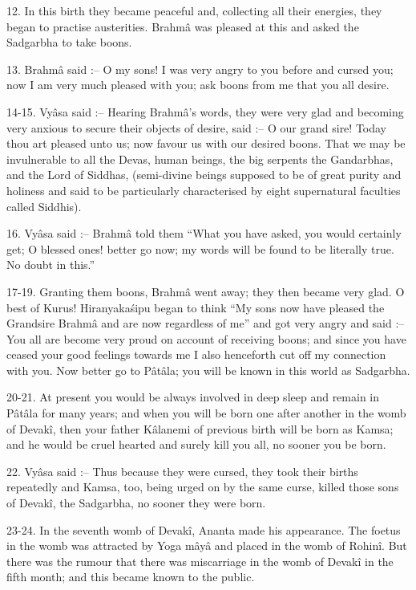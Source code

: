 12. In this birth they became peaceful and, collecting all their energies, they began to practise austerities. Brahm\^a was pleased at this and asked the Sadgarbha to take boons.

13. Brahm\^a said :-- O my sons! I was very angry to you before and cursed you; now I am very much pleased with you; ask boons from me that you all desire.

14-15. Vy\^asa said :-- Hearing Brahm\^a's words, they were very glad and becoming very anxious to secure their objects of desire, said :-- O our grand sire! Today thou art pleased unto us; now favour us with our desired boons. That we may be invulnerable to all the Devas, human beings, the big serpents the Gandarbhas, and the Lord of Siddhas, (semi-divine beings supposed to be of great purity and holiness and said to be particularly characterised by eight supernatural faculties called Siddhis).

16. Vy\^asa said :-- Brahm\^a told them ``What you have asked, you would certainly get; O blessed ones! better go now; my words will be found to be literally true. No doubt in this.''

17-19. Granting them boons, Brahm\^a went away; they then became very glad. O best of Kurus! Hiranyaka\'sipu began to think ``My sons now have pleased the Grandsire Brahm\^a and are now regardless of me'' and got very angry and said :-- You all are become very proud on account of receiving boons; and since you have ceased your good feelings towards me I also henceforth cut off my connection with you. Now better go to P\^at\^ala; you will be known in this world as Sadgarbha.

20-21. At present you would be always involved in deep sleep and remain in P\^at\^ala for many years; and when you will be born one after another in the womb of Devak\^i, then your father K\^alanemi of previous birth will be born as Kamsa; and he would be cruel hearted and surely kill you all, no sooner you be born.

22. Vy\^asa said :-- Thus because they were cursed, they took their births repeatedly and Kamsa, too, being urged on by the same curse, killed those sons of Devak\^i, the Sadgarbha, no sooner they were born.

23-24. In the seventh womb of Devak\^i, Ananta made his appearance. The foetus in the womb was attracted by Yoga m\^ay\^a and placed in the womb of Rohin\^i. But there was the rumour that there was miscarriage in the womb of Devak\^i in the fifth month; and this became known to the public.

